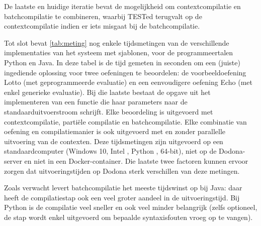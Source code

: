 De laatste en huidige iteratie bevat de mogelijkheid om contextcompilatie en batchcompilatie te combineren, waarbij TESTed terugvalt op de contextcompilatie indien er iets misgaat bij de batchcompilatie.

Tot slot bevat \cref{tab:meting} nog enkele tijdsmetingen van de verschillende implementaties van het systeem met sjablonen, voor de programmeertalen Python en Java.
In deze tabel is de tijd gemeten in seconden om een (juiste) ingediende oplossing voor twee oefeningen te beoordelen: de voorbeeldoefening Lotto (met geprogrammeerde evaluatie) en een eenvoudigere oefening Echo (met enkel generieke evaluatie).
Bij die laatste bestaat de opgave uit het implementeren van een functie die haar parameters naar de standaarduitvoerstroom schrijft.
Elke beoordeling is uitgevoerd met contextcompilatie, partiële compilatie en batchcompilatie.
Elke combinatie van oefening en compilatiemanier is ook uitgevoerd met en zonder parallelle uitvoering van de contexten.
Deze tijdsmetingen zijn uitgevoerd op een standaardcomputer (Windows 10, Intel , Python , 64-bit), niet op de Dodona-server en niet in een Docker-container.
Die laatste twee factoren kunnen ervoor zorgen dat uitvoeringstijden op Dodona sterk verschillen van deze metingen.

Zoals verwacht levert batchcompilatie het meeste tijdswinst op bij Java: daar heeft de compilatiestap ook een veel groter aandeel in de uitvoeringstijd.
Bij Python is de compilatie veel sneller en ook veel minder belangrijk (zelfs optioneel, de stap wordt enkel uitgevoerd om bepaalde syntaxisfouten vroeg op te vangen).

